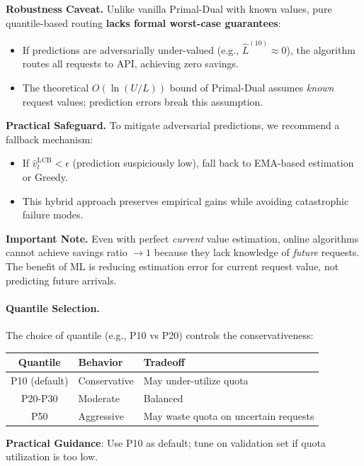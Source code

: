 \documentclass[11pt]{article}
\begin{document}
\textbf{Robustness Caveat.} Unlike vanilla Primal-Dual with known values, pure quantile-based routing \textbf{lacks formal worst-case guarantees}:
\begin{itemize}
  \item If predictions are adversarially under-valued (e.g., $\hat{L}^{(10)} \approx 0$), the algorithm routes all requests to API, achieving zero savings.
  \item The theoretical $O(\ln(U/L))$ bound of Primal-Dual assumes \emph{known} request values; prediction errors break this assumption.
\end{itemize}

\textbf{Practical Safeguard.} To mitigate adversarial predictions, we recommend a fallback mechanism:
\begin{itemize}
  \item If $\hat{v}^{\text{LCB}}_t < \epsilon$ (prediction suspiciously low), fall back to EMA-based estimation or Greedy.
  \item This hybrid approach preserves empirical gains while avoiding catastrophic failure modes.
\end{itemize}

\textbf{Important Note.} Even with perfect \emph{current} value estimation, online algorithms cannot achieve savings ratio $\to 1$ because they lack knowledge of \emph{future} requests. The benefit of ML is reducing estimation error for current request value, not predicting future arrivals.

\paragraph{Quantile Selection.}
The choice of quantile (e.g., P10 vs P20) controls the conservativeness:

\begin{center}
\begin{tabular}{|c|l|l|}
\hline
\textbf{Quantile} & \textbf{Behavior} & \textbf{Tradeoff} \\
\hline
P10 (default) & Conservative & May under-utilize quota \\
P20-P30 & Moderate & Balanced \\
P50 & Aggressive & May waste quota on uncertain requests \\
\hline
\end{tabular}
\end{center}

\textbf{Practical Guidance}: Use P10 as default; tune on validation set if quota utilization is too low.
\end{document}
